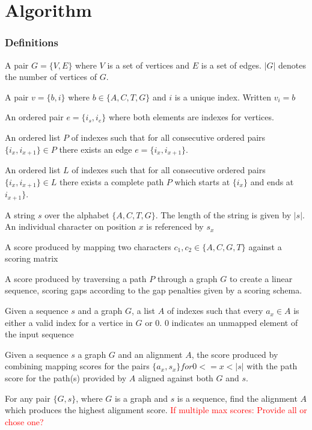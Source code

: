 \documentclass{article}
\begin{document}
\chapter{Algorithm}
\subsection{Definitions}
\begin{defn}
	A pair $G=\{V,E\}$ where $V$ is a set of vertices and $E$ is a set of edges. $|G|$ denotes the number of vertices of $G$.
\end{defn}
\begin{defn}[Vertice]
	A pair $v=\{b, i\}$ where $b \in \{A, C, T, G\}$ and $i$ is a unique index. Written $v_i=b$
\end{defn}
\begin{defn}[Edge]
	An ordered pair $e=\{i_s, i_e\}$ where both elements are indexes for vertices. 
\end{defn}
\begin{defn}
	An ordered list $P$ of indexes such that for all consecutive ordered pairs $\{i_x, i_{x+1}\} \in P$ there exists an edge $e=\{i_x, i_{x+1}\}$.
\end{defn}
\begin{defn}[Path]
	An ordered list $L$ of indexes such that for all consecutive ordered pairs $\{i_x, i_{x+1}\} \in L$ there exists a complete path $P$ which starts at $\{i_x\}$ and ends at $i_{x+1}\}$.
\end{defn}
\begin{defn}
	A string $s$ over the alphabet $\{A, C, T, G\}$. The length of the string is given by $|s|$. An individual character on position $x$ is referenced by $s_x$
\end{defn}
\begin{defn}
	A score produced by mapping two characters $c_1, c_2 \in \{A, C, G, T\}$ against a scoring matrix
\end{defn}
\begin{defn}
	A score produced by traversing a path $P$ through a graph $G$ to create a linear sequence, scoring gaps according to the gap penalties given by a scoring schema.
\end{defn}
\begin{defn}[Alignment]
	Given a sequence $s$ and a graph $G$, a list $A$ of indexes such that every $a_x \in A$ is either a valid index for a vertice in $G$ or $0$. $0$ indicates an unmapped element of the input sequence
\end{defn}
\begin{defn}
	Given a sequence $s$ a graph $G$ and an alignment $A$, the score produced by combining mapping scores for the pairs $\{a_x, s_x\} for 0<=x<|s|$ with the path score for the path(s) provided by $A$ aligned against both $G$ and $s$.
\end{defn}
\begin{defn}
	For any pair $\{G, s\}$, where $G$ is a graph and $s$ is a sequence, find the alignment $A$ which produces the highest alignment score.
	\textcolor{red}{If multiple max scores: Provide all or chose one?}
\end{defn}
\end{document}
